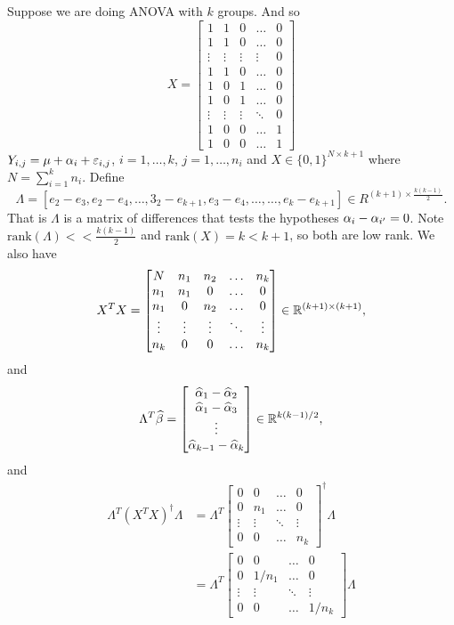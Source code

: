 \begin{ex}
    Suppose we are doing ANOVA with $k$ groups. And so 
    \[X=\begin{bmatrix}
        1&1&0&\ldots& 0\\
        1&1&0&\ldots&0\\
        \vdots&\vdots &\vdots&\vdots&0\\
        1&1&0&\ldots&0\\
        1&0&1&\ldots&0\\
        1&0&1&\ldots&0\\
    
        \vdots&\vdots &\vdots&\ddots&0\\
        1&0&0&\ldots&1\\
        1&0&0&\ldots&1
    \end{bmatrix} \]
    $Y_{i,j} = \mu+{\alpha}_i + \varepsilon_{i,j}$, $i=1,\ldots,k$, $j=1,\ldots, n_i$ and $X \in \{0,1\}^{N \times k + 1}$ where $N = \sum_{i=1}^k n_i$. Define 
    \[\Lambda = [e_2-e_3, e_2-e_4,\ldots, 3_2-e_{k+1}, e_3-e_4,\ldots, \ldots, e_k - e_{k+1}] \in R^{(k+1) \times \frac{k(k-1)}{2}}. \]
    That is $\Lambda$ is a matrix of differences that tests the hypotheses ${\alpha}_i -  {\alpha}_{i'} = 0$. Note $\text{rank}(\Lambda) << \frac{k(k-1)}{2}$ and $\text{rank}(X) = k < k+1$, so both are low rank. We also have
    \[
    X^TX = \begin{bmatrix*}
        N  &n_1&n_2&\ldots& n_k\\
        n_1&n_1&0&\ldots &0\\
        n_1&0  &n_2&\ldots &0\\
        \vdots &\vdots&\vdots &\ddots &\vdots\\
        n_k&0&0&\ldots &n_k
    \end{bmatrix*}\in \R^{(k+1)\times(k+1)},
    \]
    and
    \[\Lambda^T\widehat{\beta} = \begin{bmatrix}
        \widehat{{\alpha}}_1-\widehat{{\alpha}}_2\\
        \widehat{{\alpha}}_1-\widehat{{\alpha}}_3\\
        \vdots \\
        \widehat{{\alpha}}_{k-1}-\widehat{{\alpha}}_k
    \end{bmatrix}\in {\mathbb R}^{k(k-1)/2}, \]
    and
    \begin{align*}
        \Lambda^T (X^TX)^\dagger \Lambda &= \Lambda^T\begin{bmatrix}
            0&0&\ldots &0\\
            0&n_1&\ldots &0\\
            \vdots &\vdots & \ddots & \vdots \\
            0&0&\ldots& n_k
        \end{bmatrix}^\dagger \Lambda\\
        &=\Lambda^T\begin{bmatrix}
            0&0&\ldots &0\\
            0&1/n_1&\ldots &0\\
            \vdots &\vdots & \ddots & \vdots \\
            0&0&\ldots& 1/n_k
        \end{bmatrix} \Lambda
    \end{align*}
\end{ex}
